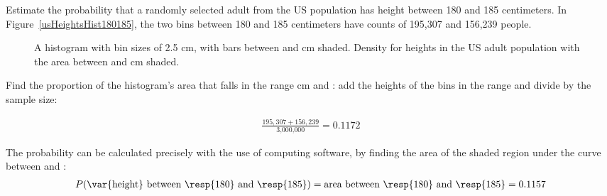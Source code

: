 \begin{example}{Estimate the probability that a randomly selected adult from the US population has height between 180 and 185 centimeters. In Figure~\ref{usHeightsHist180185}, the two bins between 180 and 185 centimeters have counts of 195,307 and 156,239 people.
		
\begin{figure}[h]
	\centering
	\caption{ A histogram with bin sizes of 2.5 cm, with bars between  and  cm shaded.   Density for heights in the US adult population with the area between  and  cm shaded.}
\end{figure}

}

Find the proportion of the histogram's area that falls in the range  cm and : add the heights of the bins in the range and divide by the sample size:

\begin{align*}                                                    
\frac{195,307+156,239}{\text{3,000,000}} = 0.1172                
\end{align*}

The probability can be calculated precisely with the use of computing software, by finding the area of the shaded region under the curve between  and :
\begin{align*}
P(\text{\var{height} between \resp{180} and \resp{185}})
= \text{area between \resp{180} and \resp{185}}
= 0.1157
\end{align*}


\label{probabilityOfBetween180185}
\end{example}

